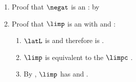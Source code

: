 \begin{proofns}
\begin{enumerate}
  \item Proof that $\negat$ is an : by 
  \item Proof that $\limp$ is an  with  and :
    \begin{enumerate}
        \item $\latL$ is  and therefore is .
        \item $\limp$ is equivalent to the  $\limpc$ .
        \item By , $\limp$ has  and .
    \end{enumerate}
\end{enumerate}
\end{proofns}


